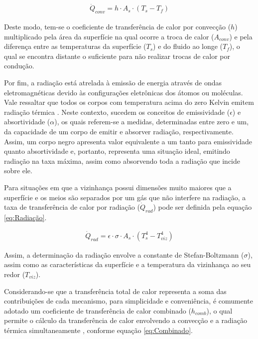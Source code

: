 \documentclass[acronym,symbols]{fei}
\begin{document}
\begin{equation} \label{eq:Convecção}
\begin{aligned}
    \dot{Q}_{conv}=h \cdot A_{s} \cdot (T_{s}-T_{f})
\end{aligned}
\end{equation}

Deste modo, tem-se o coeficiente de transferência de calor por convecção ($h$) multiplicado pela área da superfície na qual ocorre a troca de calor ($A_{conv}$) e pela diferença entre as temperaturas da superfície ($T_{s}$) e do fluido ao longe ($T_{f}$), o qual se encontra distante o suficiente para não realizar trocas de calor por condução.

Por fim, a radiação está atrelada à emissão de energia através de ondas eletromagnéticas devido às configurações eletrônicas dos átomos ou moléculas. Vale ressaltar que todos os corpos com temperatura acima do zero Kelvin emitem radiação térmica \cite{ccengel2006termodinamica}. Neste contexto, sucedem os conceitos de emissividade ($\epsilon$) e absortividade ($\alpha$), os quais referem-se a medidas, determinadas entre zero e um, da capacidade de um corpo de emitir e absorver radiação, respectivamente. Assim, um corpo negro apresenta valor equivalente a um tanto para emissividade quanto absortividade e, portanto, representa uma situação ideal, emitindo radiação na taxa máxima, assim como absorvendo toda a radiação que incide sobre ele. 

Para situações em que a vizinhança possui dimensões muito maiores que a superfície e os meios são separados por um gás que não interfere na radiação, a taxa de transferência de calor por radiação ($\dot{Q}_{rad}$) pode ser definida pela equação \ref{eq:Radiação}.

\begin{equation} \label{eq:Radiação}
\begin{aligned}
    \dot{Q}_{rad}=\epsilon \cdot \sigma \cdot A_{s} \cdot (T_{s}^4-T_{viz}^4)
\end{aligned}
\end{equation}

Assim, a determinação da radiação envolve a constante de Stefan-Boltzmann ($\sigma$), assim como as características da superfície e a temperatura da vizinhança ao seu redor ($T_{viz}$).

Considerando-se que a transferência total de calor representa a soma das contribuições de cada mecanismo, para simplicidade e conveniência, é comumente adotado um coeficiente de transferência de calor combinado ($h_{comb}$), o qual permite o cálculo da transferência de calor envolvendo a convecção e a radiação térmica simultaneamente \cite{yunus2003heat}, conforme equação \ref{eq:Combinado}.
\end{document}
